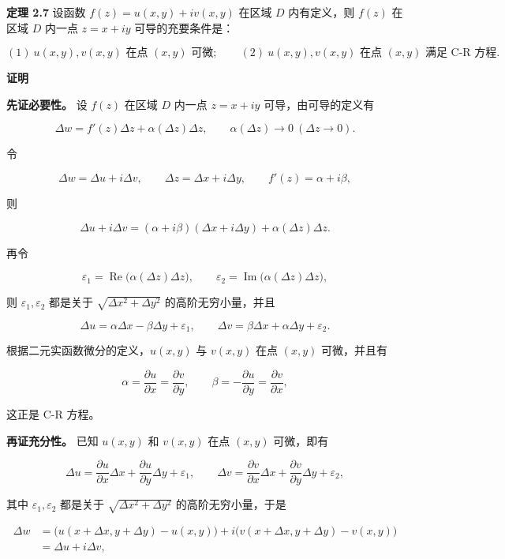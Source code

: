 \textbf{定理 2.7} 设函数 \(f(z)=u(x,y)+iv(x,y)\) 在区域 \(D\)
内有定义，则 \(f(z)\) 在区域 \(D\) 内一点 \(z=x+iy\) 可导的充要条件是：

\[
(1)\ u(x,y),v(x,y)\text{ 在点 }(x,y)\text{ 可微};\qquad
(2)\ u(x,y),v(x,y)\text{ 在点 }(x,y)\text{ 满足 C-R 方程}.
\]

\textbf{证明}

\textbf{先证必要性。} 设 \(f(z)\) 在区域 \(D\) 内一点 \(z=x+iy\)
可导，由可导的定义有

\[
\Delta w=f'(z)\Delta z+\alpha(\Delta z)\Delta z,\qquad \alpha(\Delta z)\to0\ (\Delta z\to0).
\]

令

\[
\Delta w=\Delta u+i\Delta v,\qquad \Delta z=\Delta x+i\Delta y,\qquad f'(z)=\alpha+i\beta,
\]

则

\[
\Delta u+i\Delta v=(\alpha+i\beta)(\Delta x+i\Delta y)+\alpha(\Delta z)\Delta z .
\]

再令

\[
\varepsilon_1=\operatorname{Re}\bigl(\alpha(\Delta z)\Delta z\bigr),\qquad
\varepsilon_2=\operatorname{Im}\bigl(\alpha(\Delta z)\Delta z\bigr),
\]

则 \(\varepsilon_1,\varepsilon_2\) 都是关于
\(\sqrt{\Delta x^2+\Delta y^2}\) 的高阶无穷小量，并且

\[
\Delta u=\alpha\Delta x-\beta\Delta y+\varepsilon_1,\qquad
\Delta v=\beta\Delta x+\alpha\Delta y+\varepsilon_2 .
\]

根据二元实函数微分的定义，\(u(x,y)\) 与 \(v(x,y)\) 在点 \((x,y)\)
可微，并且有

\[
\alpha=\frac{\partial u}{\partial x}=\frac{\partial v}{\partial y},\qquad
\beta=-\frac{\partial u}{\partial y}=\frac{\partial v}{\partial x},
\]

这正是 C-R 方程。

\textbf{再证充分性。} 已知 \(u(x,y)\) 和 \(v(x,y)\) 在点 \((x,y)\)
可微，即有

\[
\Delta u=\frac{\partial u}{\partial x}\Delta x+\frac{\partial u}{\partial y}\Delta y+\varepsilon_1,\qquad
\Delta v=\frac{\partial v}{\partial x}\Delta x+\frac{\partial v}{\partial y}\Delta y+\varepsilon_2,
\]

其中 \(\varepsilon_1,\varepsilon_2\) 都是关于
\(\sqrt{\Delta x^2+\Delta y^2}\) 的高阶无穷小量，于是

\[
\begin{aligned}
\Delta w
&=\bigl(u(x+\Delta x,y+\Delta y)-u(x,y)\bigr)+i\bigl(v(x+\Delta x,y+\Delta y)-v(x,y)\bigr)\\
&=\Delta u+i\Delta v,
\end{aligned}
\]

